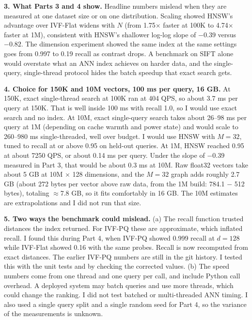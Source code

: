 \documentclass[10pt]{article}
\begin{document}
\textbf{3. What Parts 3 and 4 show.} Headline numbers mislead when they are measured at one dataset size or on one distribution. Scaling showed HNSW's advantage over IVF-Flat widens with $N$ (from 1.75$\times$ faster at 100K to 4.74$\times$ faster at 1M), consistent with HNSW's shallower log-log slope of $-0.39$ versus $-0.82$. The dimension experiment showed the same index at the same settings goes from 0.997 to 0.19 recall as contrast drops. A benchmark on SIFT alone would overstate what an ANN index achieves on harder data, and the single-query, single-thread protocol hides the batch speedup that exact search gets.

\textbf{4. Choice for 150K and 10M vectors, 100 ms per query, 16 GB.} At 150K, exact single-thread search at 100K ran at 404 QPS, so about 3.7 ms per query at 150K. That is well inside 100 ms with recall 1.0, so I would use exact search and no index. At 10M, exact single-query search takes about 26--98 ms per query at 1M (depending on cache warmth and power state) and would scale to 260--980 ms single-threaded, well over budget. I would use HNSW with $M=32$, tuned to recall at or above 0.95 on held-out queries. At 1M, HNSW reached 0.95 at about 7250 QPS, or about 0.14 ms per query. Under the slope of $-0.39$ measured in Part 3, that would be about 0.3 ms at 10M. Raw float32 vectors take about 5 GB at 10M $\times$ 128 dimensions, and the $M=32$ graph adds roughly 2.7 GB (about 272 bytes per vector above raw data, from the 1M build: 784.1 $-$ 512 bytes), totaling $\approx$7.8 GB, so it fits comfortably in 16 GB. The 10M estimates are extrapolations and I did not run that size.

\textbf{5. Two ways the benchmark could mislead.} (a) The recall function trusted distances the index returned. For IVF-PQ these are approximate, which inflated recall. I found this during Part 4, when IVF-PQ showed 0.999 recall at $d=128$ while IVF-Flat showed 0.16 with the same probes. Recall is now recomputed from exact distances. The earlier IVF-PQ numbers are still in the git history. I tested this with the unit tests and by checking the corrected values. (b) The speed numbers come from one thread and one query per call, and include Python call overhead. A deployed system may batch queries and use more threads, which could change the ranking. I did not test batched or multi-threaded ANN timing. I also used a single query split and a single random seed for Part 4, so the variance of the measurements is unknown.
\end{document}
